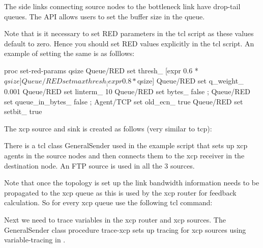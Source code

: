   The side links connecting source nodes to the bottleneck link have
  drop-tail queues. 
  The API  allows users to set the buffer size in the queue.
  
  Note that is it necessary to set RED parameters in the tcl script as
  these values default to zero. Hence you should set RED values
  explicitly in the tcl script. An example of setting the same is as
  folllows: 
  \begin{program}
    proc set-red-params { qsize } {
      Queue/RED set thresh_ [expr 0.6 * $qsize]
      Queue/RED set maxthresh_ [expr 0.8 * $qsize]
      Queue/RED set q_weight_ 0.001
      Queue/RED set linterm_ 10
      Queue/RED set bytes_ false ;
      Queue/RED set queue_in_bytes_ false ;
      Agent/TCP set old_ecn_ true
      Queue/RED set setbit_     true
    }
  \end{program}

  The xcp source and sink is created as follows (very similar to tcp):
  
  There is a tcl class GeneralSender used in the example script that
  sets up xcp agents in the source nodes and then connects them to the
  xcp receiver in the destination node. An FTP source is used in all the
  3 sources. 

  Note that once the topology is set up the link bandwidth information
  needs to be propagated to the xcp queue as this is used by the xcp
  router for feedback calculation. So for every xcp queue use the
  following tcl command:
  
  
  Next we need to trace variables in the xcp router and xcp
  sources. The GeneralSender class procedure trace-xcp sets up tracing
  for xcp sources using variable-tracing in \ns{}. 
  
    
